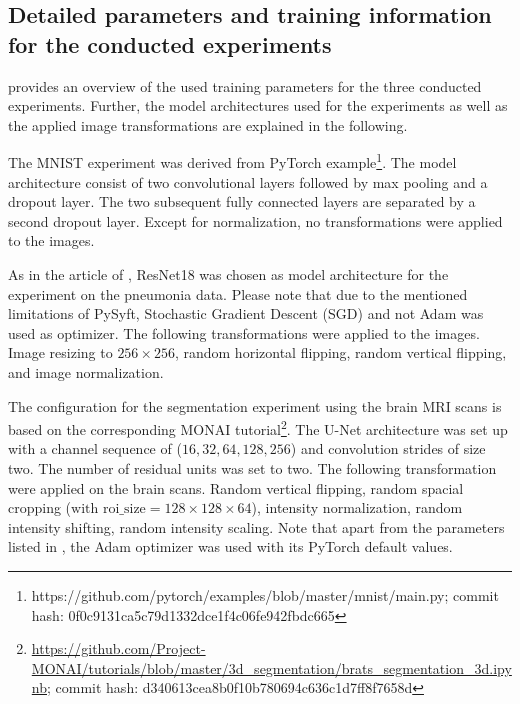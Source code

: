 \newpage
\subsection{Detailed parameters and training information for the conducted experiments}
\label{apdx:B}

 provides an overview of the used training parameters for the three conducted experiments.
Further, the model architectures used for the experiments as well as the applied image transformations are explained in the following.



The MNIST experiment was derived from PyTorch example\footnote{https://github.com/pytorch/examples/blob/master/mnist/main.py; commit hash: 0f0c9131ca5c79d1332dce1f4c06fe942fbdc665}. The model architecture consist of two convolutional layers followed by max pooling and a dropout layer. The two subsequent fully connected layers are separated by a second dropout layer.
Except for normalization, no transformations were applied to the images.


As in the article of \cite{Kaissis2021End-to-endImaging}, ResNet18 \cite{He2016DeepRecognition} was chosen as model architecture for the experiment on the pneumonia data. Please note that due to the mentioned limitations of PySyft, Stochastic Gradient Descent (SGD) and not Adam was used as optimizer.
The following transformations were applied to the images.
Image resizing to $256 \times 256$,
random horizontal flipping,
random vertical flipping,
and image normalization.


The configuration for the segmentation experiment using the brain MRI scans is based on the corresponding MONAI tutorial\footnote{\url{https://github.com/Project-MONAI/tutorials/blob/master/3d\_segmentation/brats\_segmentation\_3d.ipynb}; commit hash: d340613cea8b0f10b780694c636c1d7ff8f7658d}.
The U-Net architecture was set up with a channel sequence of ($16, 32, 64, 128, 256$) and convolution strides of size two. The number of residual units was set to two.
The following transformation were applied on the brain scans.
Random vertical flipping,
random spacial cropping ($\textrm{with roi\_size} =  128 \times 128 \times 64$),
intensity normalization,
random intensity shifting,
random intensity scaling.
Note that apart from the parameters listed in , the Adam optimizer \cite{Kingma2014Adam:Optimization} was used with its PyTorch default values.